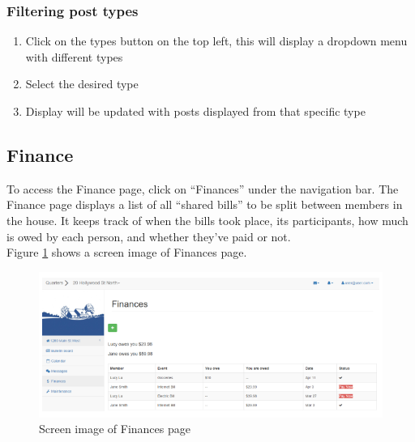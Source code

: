 \documentclass[12pt]{article}
\begin{document}
    \subsubsection{Filtering post types}
    \begin{enumerate}
        \item Click on the types button on the top left, this will display a dropdown menu with different types
        \item Select the desired type
        \item Display will be updated with posts displayed from that specific type
    \end{enumerate}


    \subsection{Finance}
    To access the Finance page, click on ``Finances'' under the navigation bar. The Finance page displays a list of all ``shared bills'' to be split between members in the house. It keeps track of when the bills took place, its participants, how much is owed by each person, and whether they've paid or not.\\
    Figure \ref{fig:finances} shows a screen image of Finances page.
    \begin{figure}
        \centering
        \includegraphics[width=\textwidth]{finances}
        \caption{Screen image of Finances page}
        \label{fig:finances}
    \end{figure}
\end{document}
